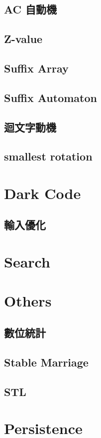 \subsection{AC 自動機}

\subsection{Z-value}

\subsection{Suffix Array}

\subsection{Suffix Automaton}

\subsection{迴文字動機}

\subsection{smallest rotation}


\section{Dark Code}

\subsection{輸入優化}


\section{Search}


\section{Others}

\subsection{數位統計}

\subsection{Stable Marriage}

\subsection{STL}



\section{Persistence}


